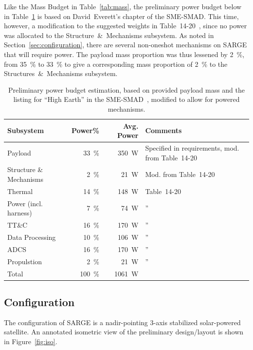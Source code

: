 \documentclass[9pt]{article}
\begin{document}
Like the Mass Budget in Table~\ref{tab:mass}, the preliminary power budget below in Table~\ref{tab:power} is based on David~Everett's chapter of the SME-SMAD.
This time, however, a modification to the suggested weights in Table~14-20~\cite[p. 424]{sme}, since no power was allocated to the Structure~\&~Mechanisms subsystem.
As noted in Section~\ref{sec:configuration}, there are several non-oneshot mechanisms on SARGE that will require power.
The payload mass proportion was thus lessened by \qty{2}{\percent}, from \qty{35}{\percent} to \qty{33}{\percent} to give a corresponding mass proportion of \qty{2}{\percent} to the Structures~\&~Mechanisms subsystem.

\begin{table}[h]
  \centering
  \begin{tabular}{l|r r l}
    \toprule
    Subsystem & Power\% & Avg. Power & Comments \\
    \midrule
    Payload & \qty{33}{\percent} & \qty{350}{\watt} & Specified in requirements, mod. from Table~14-20 \\ 
    Structure \& Mechanisms & \qty{2}{\percent} & \qty{21}{\watt} & Mod. from Table~14-20 \\
    Thermal & \qty{14}{\percent} & \qty{148}{\watt} & Table~14-20 \\
    Power (incl. harness) & \qty{7}{\percent} & \qty{74}{\watt} & ''\\
    TT\&C & \qty{16}{\percent} & \qty{170}{\watt} & ''\\
    Data Processing & \qty{10}{\percent} & \qty{106}{\watt} &''\\
    ADCS & \qty{16}{\percent} & \qty{170}{\watt}&''\\
    Propulstion & \qty{2}{\percent} & \qty{21}{\watt} & ''\\
    \midrule
    Total & \qty{100}{\percent} & \qty{1061}{\watt} &\\
    \bottomrule
  \end{tabular}
  \caption{Preliminary power budget estimation, based on provided payload mass and the listing for ``High Earth'' in the SME-SMAD~\cite{sme}, modified to allow for powered mechanisms.}
  \label{tab:power}
\end{table}

\subsection{Configuration}
The configuration of SARGE is a nadir-pointing 3-axis stabilized solar-powered satellite.
An annotated isometric view of the preliminary design/layout is shown in Figure~\ref{fig:iso}.
\end{document}
